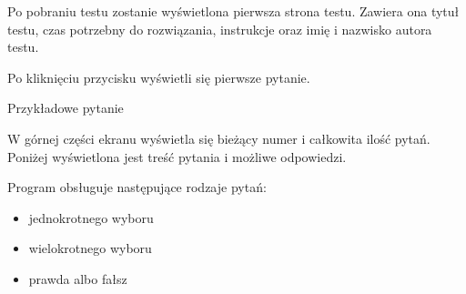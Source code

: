\documentclass[letterpaper,10pt,polish]{sphinxmanual}
\begin{document}

Po pobraniu testu zostanie wyświetlona pierwsza strona testu. Zawiera ona tytuł testu, czas potrzebny do rozwiązania, instrukcje oraz imię i nazwisko autora testu.

Po kliknięciu przycisku  wyświetli się pierwsze pytanie.

Przykładowe pytanie


W górnej części ekranu wyświetla się bieżący numer i całkowita ilość pytań. Poniżej wyświetlona jest treść pytania i możliwe odpowiedzi.

Program obsługuje następujące rodzaje pytań:
\begin{itemize}
\item {} 
jednokrotnego wyboru

\item {} 
wielokrotnego wyboru

\item {} 
prawda albo fałsz

\end{itemize}
\end{document}
